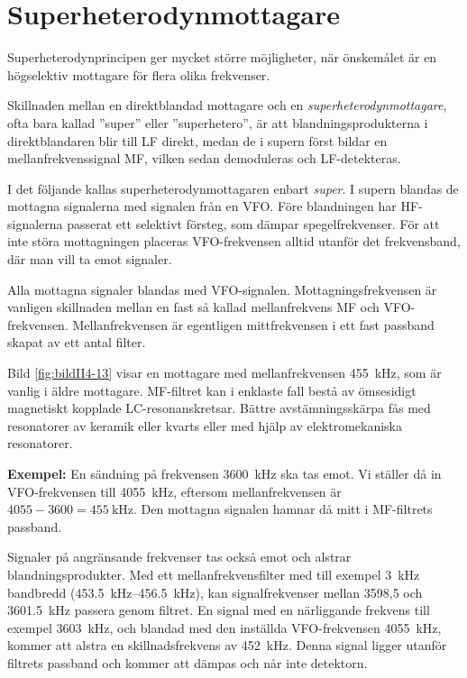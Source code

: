 \section{Superheterodynmottagare}
\label{superheterodynmottagaren}

Superheterodynprincipen ger mycket större möjligheter, när önskemålet
är en högselektiv mottagare för flera olika frekvenser.

Skillnaden mellan en direktblandad mottagare och en
\emph{superheterodynmottagare}, ofta bara kallad ''super'' eller
''superhetero'', är att blandningsprodukterna i direktblandaren blir till
LF direkt, medan de i supern först bildar en mellanfrekvenssignal MF,
vilken sedan demoduleras och LF-detekteras.

I det följande kallas superheterodynmottagaren enbart \emph{super}.
I supern blandas de mottagna signalerna med signalen från en VFO.
Före blandningen har HF-signalerna passerat ett selektivt försteg, som
dämpar spegelfrekvenser.
För att inte störa mottagningen placeras VFO-frekvensen alltid utanför
det frekvensband, där man vill ta emot signaler.

Alla mottagna signaler blandas med VFO-signalen.
Mottagningsfrekvensen är vanligen skillnaden mellan en fast så kallad
mellanfrekvens MF och VFO-frekvensen.
Mellanfrekvensen är egentligen mittfrekvensen i ett fast passband skapat av
ett antal filter.


Bild \ref{fig:bildII4-13} visar en mottagare med mellanfrekvensen
\SI{455}{\kilo\hertz}, som är vanlig i äldre mottagare.
MF-filtret kan i enklaste fall bestå av ömsesidigt magnetiskt kopplade
LC-resonanskretsar.
Bättre avstämningsskärpa fås med resonatorer av keramik eller kvarts eller med
hjälp av elektromekaniska resonatorer.

\textbf{Exempel:}
En sändning på frekvensen \SI{3600}{\kilo\hertz} ska tas emot.
Vi ställer då in VFO-frekvensen till \SI{4055}{\kilo\hertz}, eftersom
mellanfrekvensen är \(4055 - 3600 = \SI{455}{\kilo\hertz}\).
Den mottagna signalen hamnar då mitt i MF-filtrets passband.

Signaler på angränsande frekvenser tas också emot och alstrar
blandningsprodukter.
Med ett mellanfrekvensfilter med till exempel \SI{3}{\kilo\hertz} bandbredd
(\SIrange{453,5}{456,5}{\kilo\hertz}), kan signalfrekvenser mellan 3598,5 och
\SI{3601,5}{\kilo\hertz} passera genom filtret.
En signal med en närliggande frekvens till exempel \SI{3603}{\kilo\hertz}, och
blandad med den inställda VFO-frekvensen \SI{4055}{\kilo\hertz}, kommer att
alstra en skillnadsfrekvens av \SI{452}{\kilo\hertz}.
Denna signal ligger utanför filtrets passband och kommer att dämpas och når
inte detektorn.

